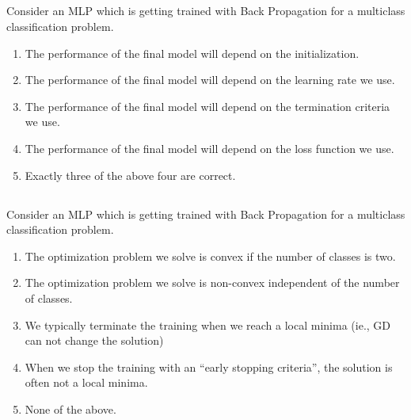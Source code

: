 
\begin{frame}
\section{}
Consider an MLP which is getting trained with Back Propagation for a multiclass classification problem.
\begin{enumerate}[label=(\Alph*)]
\item The performance of the final model will depend on the initialization.   %
\item The performance of the final model will depend on the learning rate we use.   %
\item The performance of the final model will depend on the termination criteria we use.    %
\item The performance of the final model will depend on the loss function we use.   %
\item Exactly three of the above four are correct.  %

\end{enumerate}

\end{frame}


\begin{frame}
\section{}
Consider an MLP which is getting trained with Back Propagation for a multiclass classification problem.

\begin{enumerate}[label=(\Alph*)]
\item The optimization problem we solve is convex if the number of classes is  two.
\item The optimization problem we solve is non-convex independent of the number of classes.   %
\item We typically terminate the training when we reach a local minima (ie., GD can not change the solution)    %
\item When we stop the training with an ``early stopping criteria'', the solution is often not a local minima.
\item None of the above.    %
\end{enumerate}
\end{frame}
